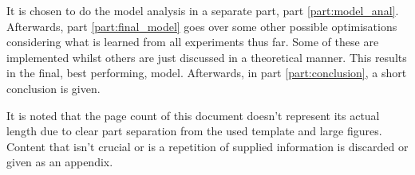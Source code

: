 It is chosen to do the model analysis in a separate part, part \ref{part:model_anal}.
Afterwards, part \ref{part:final_model} goes over some other possible optimisations considering what is learned from all experiments thus far.
Some of these are implemented whilst others are just discussed in a theoretical manner.
This results in the final, best performing, model.
Afterwards, in part \ref{part:conclusion}, a short conclusion is given.

It is noted that the page count of this document doesn't represent its actual length due to clear part separation from the used template and large figures.
Content that isn't crucial or is a repetition of supplied information is discarded or given as an appendix.